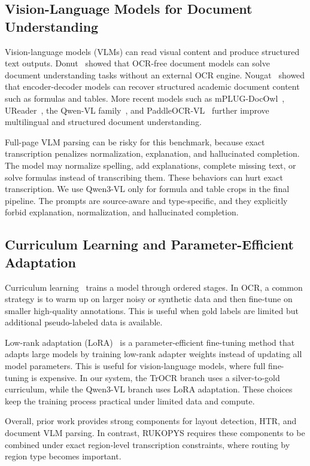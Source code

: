 \documentclass[runningheads]{llncs}
\begin{document}
\subsection{Vision-Language Models for Document Understanding}
Vision-language models (VLMs) can read visual content and produce structured text outputs. Donut~\cite{kim2022donut} showed that OCR-free document models can solve document understanding tasks without an external OCR engine. Nougat~\cite{blecher2023nougat} showed that encoder-decoder models can recover structured academic document content such as formulas and tables. More recent models such as mPLUG-DocOwl~\cite{ye2023docowl}, UReader~\cite{ye2023ureader}, the Qwen-VL family~\cite{bai2023qwenvl, qwen3vltechnicalreport}, and PaddleOCR-VL~\cite{zhang2026paddleocrvl16} further improve multilingual and structured document understanding.

Full-page VLM parsing can be risky for this benchmark, because exact transcription penalizes normalization, explanation, and hallucinated completion. The model may normalize spelling, add explanations, complete missing text, or solve formulas instead of transcribing them. These behaviors can hurt exact transcription. We use Qwen3-VL \cite{qwen3vltechnicalreport} only for formula and table crops in the final pipeline. The prompts are source-aware and type-specific, and they explicitly forbid explanation, normalization, and hallucinated completion.

\subsection{Curriculum Learning and Parameter-Efficient Adaptation}
Curriculum learning~\cite{bengio2009curriculum} trains a model through ordered stages. In OCR, a common strategy is to warm up on larger noisy or synthetic data and then fine-tune on smaller high-quality annotations. This is useful when gold labels are limited but additional pseudo-labeled data is available.

Low-rank adaptation (LoRA)~\cite{hu2022lora} is a parameter-efficient fine-tuning method that adapts large models by training low-rank adapter weights instead of updating all model parameters. This is useful for vision-language models, where full fine-tuning is expensive. In our system, the TrOCR branch uses a silver-to-gold curriculum, while the Qwen3-VL branch uses LoRA adaptation. These choices keep the training process practical under limited data and compute.

Overall, prior work provides strong components for layout detection, HTR, and document VLM parsing. In contrast, RUKOPYS requires these components to be combined under exact region-level transcription constraints, where routing by region type becomes important.
\end{document}
